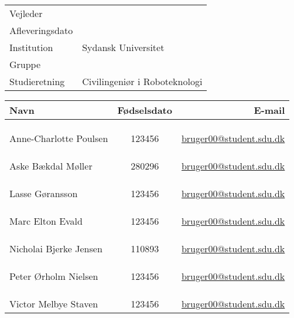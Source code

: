 \documentclass[../main.tex]{subfiles}
\begin{document}
\phantom{g}
\vspace{0.5cm}
\noindent
\begin{center}
\begin{Huge}
\textbf{\titel}
\end{Huge}
\\
\begin{huge}
\subtitel
\end{huge}
\\
\vspace{1cm}



\vspace{.7cm}

\begin{tabular}{@{} l l @{}}
\hline
Vejleder         		&	\vejleder          	\\
Afleveringsdato 			& 	\dato				\\
Institution             	&   Sydansk Universitet	\\
Gruppe                  	&	\gruppe				\\
Studieretning           	& 	Civilingeniør i Roboteknologi	\\
\hline
\end{tabular}
\thispagestyle{empty}

\vspace{1.5cm}


\newcommand{\fmedlem}[3]{%
\multicolumn{3}{c}{}\\
\multicolumn{3}{c}{}\\
\multicolumn{3}{c}{}\\
\hline
#1 & #2 & 	\href{mailto:#3@student.sdu.dk}{#3@student.sdu.dk}\\
}

\begin{tabular}{ l  c  r }

Navn						& Fødselsdato &	E-mail \\
\hline
\fmedlem{Anne-Charlotte Poulsen}{123456}{bruger00}
\fmedlem{Aske Bækdal Møller}{280296}{bruger00}
\fmedlem{Lasse Gøransson}{123456}{bruger00}
\fmedlem{Marc Elton Evald}{123456}{bruger00}
\fmedlem{Nicholai Bjerke Jensen}{110893}{bruger00}
\fmedlem{Peter Ørholm Nielsen}{123456}{bruger00}
\fmedlem{Victor Melbye Staven}{123456}{bruger00}
\end{tabular}
\end{center}
\end{document}
